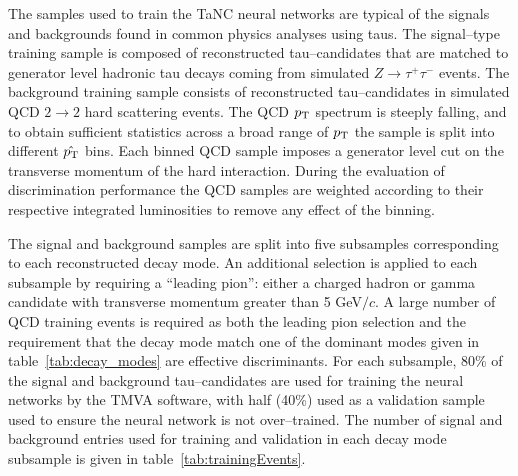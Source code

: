 The samples used to train the TaNC neural networks are typical of the signals
and backgrounds found in common physics analyses using taus.  The signal--type
training sample is composed of reconstructed tau--candidates that are matched
to generator level hadronic tau decays coming from simulated $Z \rightarrow
\tau^{+}\tau^{-}$ events.  The background training sample consists of
reconstructed tau--candidates in simulated QCD $2\rightarrow2$ hard scattering
events.  The QCD $p_{\mathrm{T}}$ spectrum is steeply falling, and to obtain sufficient
statistics across a broad range of $p_{\mathrm{T}}$ the sample is split into different
$\hat {p_{\mathrm{T}}}$ bins.  Each binned QCD sample imposes a generator level cut on the
transverse momentum of the hard interaction.  During the evaluation of discrimination
performance the QCD samples are weighted according to their respective
integrated luminosities to remove any effect of the binning.

The signal and background samples are split into five subsamples corresponding
to each reconstructed decay mode.  An additional selection is applied to each
subsample by requiring a ``leading pion'': either a charged hadron or gamma
candidate with transverse momentum greater than 5 GeV$/c$.  A large number of
QCD training events is required as both the leading pion selection and the
requirement that the decay mode match one of the dominant modes given in
table~\ref{tab:decay_modes} are effective discriminants.  For each subsample,
80\% of the signal and background tau--candidates are used for training the
neural networks by the TMVA software, with half (40\%) used as a validation
sample used to ensure the neural network is not over--trained. The number of
signal and background entries used for training and validation in each decay
mode subsample is given in table~\ref{tab:trainingEvents}.


